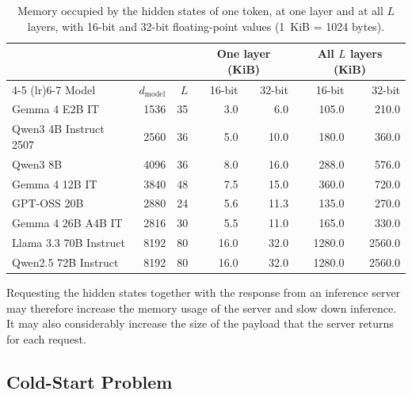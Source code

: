 \begin{table}[htbp]
    \centering
    \small
    \begin{tabular}{lrrrrrr}
        \toprule
        & & & \multicolumn{2}{c}{One layer (KiB)} & \multicolumn{2}{c}{All $L$ layers (KiB)} \\
        \cmidrule(lr){4-5} \cmidrule(lr){6-7}
        Model & $d_{\mathrm{model}}$ & $L$ & 16-bit & 32-bit & 16-bit & 32-bit \\
        \midrule
        Gemma 4 E2B IT & 1536 & 35 & 3.0 & 6.0 & 105.0 & 210.0 \\
        Qwen3 4B Instruct 2507 & 2560 & 36 & 5.0 & 10.0 & 180.0 & 360.0 \\
        Qwen3 8B & 4096 & 36 & 8.0 & 16.0 & 288.0 & 576.0 \\
        Gemma 4 12B IT & 3840 & 48 & 7.5 & 15.0 & 360.0 & 720.0 \\
        GPT-OSS 20B & 2880 & 24 & 5.6 & 11.3 & 135.0 & 270.0 \\
        Gemma 4 26B A4B IT & 2816 & 30 & 5.5 & 11.0 & 165.0 & 330.0 \\
        Llama 3.3 70B Instruct & 8192 & 80 & 16.0 & 32.0 & 1280.0 & 2560.0 \\
        Qwen2.5 72B Instruct & 8192 & 80 & 16.0 & 32.0 & 1280.0 & 2560.0 \\
        \bottomrule
    \end{tabular}
    \caption[Hidden-state memory per token, at one layer and at all $L$ layers]{Memory occupied by the hidden states of one token, at one layer and at all $L$ layers, with 16-bit and 32-bit floating-point values (1~KiB = 1024 bytes).}
    \label{tab:ch9-hidden-state-size}
\end{table}

Requesting the hidden states together with the response from an inference server may therefore increase the memory usage of the server and slow down inference. It may also considerably increase the size of the payload that the server returns for each request.

\subsection{Cold-Start Problem}
\label{subsec:ch9-flag-cold-start}

